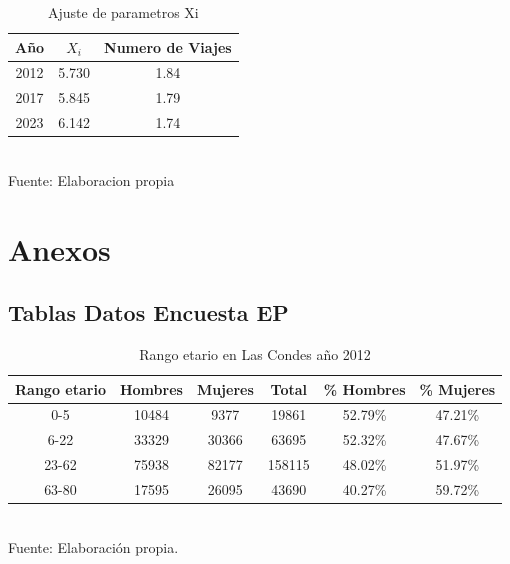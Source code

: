 \documentclass[12pt]{article} %
\begin{document}
\begin{table}[H]
    \centering
    \caption{Ajuste de parametros Xi}
    \vspace{0.2cm}
    \begin{tabular}{|c|c|c|}
        \hline
        Año & $X_i$ & Numero de Viajes \\
        \hline
        2012 & 5.730 & 1.84 \\
        2017 & 5.845 & 1.79 \\
        2023 & 6.142 & 1.74 \\
        \hline
    \end{tabular}
    \vspace{0.2cm}
    \\Fuente: Elaboracion propia
\end{table}


\section{Anexos}

\subsection{Tablas Datos Encuesta EP}

\begin{table}[H]
    \centering
    \caption{Rango etario en Las Condes año 2012}
    \begin{tabular}{|c|c|c|c|c|c|}
    \hline
    \textbf{Rango etario} & \textbf{Hombres} & \textbf{Mujeres} & \textbf{Total} & \textbf{\% Hombres} & \textbf{\% Mujeres} \\ \hline
    0-5 & 10484 & 9377 & 19861 & 52.79\% & 47.21\% \\ \hline
    6-22 & 33329 & 30366 & 63695 & 52.32\% & 47.67\% \\ \hline
    23-62 & 75938 & 82177 & 158115 & 48.02\% & 51.97\% \\ \hline
    63-80 & 17595 & 26095 & 43690 & 40.27\% & 59.72\% \\ \hline
    \end{tabular}
    \label{Cuadro 4}
    \\Fuente: Elaboración propia.
\end{table}
\end{document}
